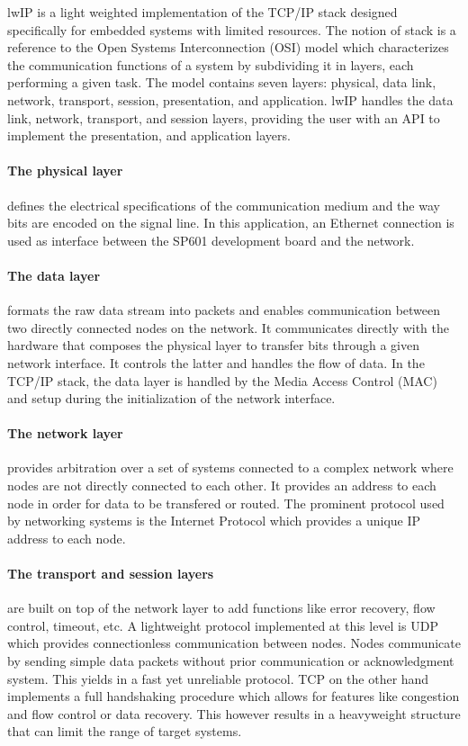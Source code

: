       lwIP is a light weighted implementation of the TCP/IP stack designed specifically for embedded systems with limited resources. The notion of stack is a reference to the Open Systems Interconnection (OSI) model which characterizes the communication functions of a system by subdividing it in layers, each performing a given task. The model contains seven layers: physical, data link, network, transport, session, presentation, and application. lwIP handles the data link, network, transport, and session layers, providing the user with an API to implement the presentation, and application layers.

      \paragraph{The physical layer} defines the electrical specifications of the communication medium and the way bits are encoded on the signal line. In this application, an Ethernet connection is used as interface between the SP601 development board and the network.

      \paragraph{The data layer} formats the raw data stream into packets and enables communication between two directly connected nodes on the network. It communicates directly with the hardware that composes the physical layer to transfer bits through a given network interface. It controls the latter and handles the flow of data. In the TCP/IP stack, the data layer is handled by the Media Access Control (MAC) and setup during the initialization of the network interface.

      \paragraph{The network layer} provides arbitration over a set of systems connected to a complex network where nodes are not directly connected to each other. It provides an address to each node in order for data to be transfered or routed. The prominent protocol used by networking systems is the Internet Protocol which provides a unique IP address to each node.

      \paragraph{The transport and session layers} are built on top of the network layer to add functions like error recovery, flow control, timeout, etc. A lightweight protocol implemented at this level is UDP which provides connectionless communication between nodes. Nodes communicate by sending simple data packets without prior communication or acknowledgment system. This yields in a fast yet unreliable protocol. TCP on the other hand implements a full handshaking procedure which allows for features like congestion and flow control or data recovery. This however results in a heavyweight structure that can limit the range of target systems.

